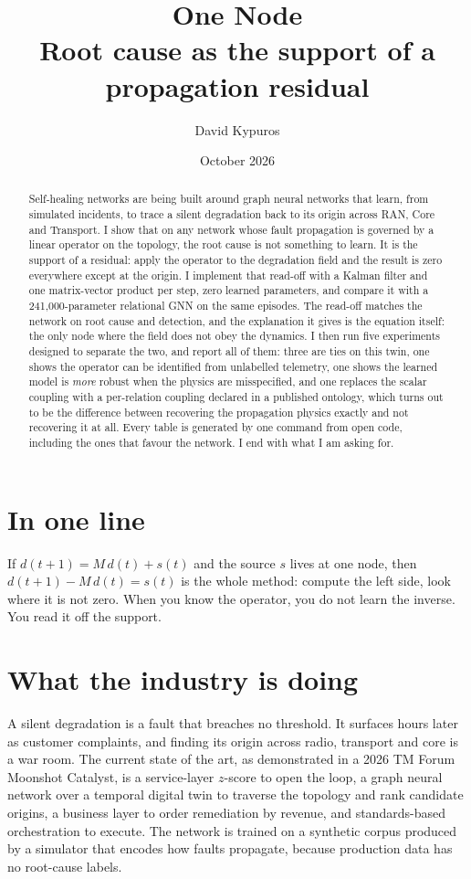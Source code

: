 \documentclass[11pt,a4paper]{article}
\title{\textbf{One Node}\\[0.3em]\large Root cause as the support of a propagation residual}
\author{David Kypuros}
\date{October 2026}
\begin{document}
\maketitle

\begin{abstract}
\noindent Self-healing networks are being built around graph neural networks that learn, from
simulated incidents, to trace a silent degradation back to its origin across RAN, Core and
Transport. I show that on any network whose fault propagation is governed by a linear operator on
the topology, the root cause is not something to learn. It is the support of a residual: apply the
operator to the degradation field and the result is zero everywhere except at the origin. I
implement that read-off with a Kalman filter and one matrix-vector product per step, zero learned
parameters, and compare it with a 241{,}000-parameter relational GNN on the same episodes. The
read-off matches the network on root cause and detection, and the explanation it gives is the
equation itself: the only node where the field does not obey the dynamics. I then run five
experiments designed to separate the two, and report all of them: three are ties on this twin, one
shows the operator can be identified from unlabelled telemetry, one shows the learned model is
\emph{more} robust when the physics are misspecified, and one replaces the scalar coupling with a
per-relation coupling declared in a published ontology, which turns out to be the difference
between recovering the propagation physics exactly and not recovering it at all. Every table is generated by one command from
open code, including the ones that favour the network. I end with what I am asking for.
\end{abstract}

\section*{In one line}
If $d(t{+}1)=M\,d(t)+s(t)$ and the source $s$ lives at one node, then $d(t{+}1)-M\,d(t)=s(t)$ is
the whole method: compute the left side, look where it is not zero. When you know the operator, you
do not learn the inverse. You read it off the support.

\section{What the industry is doing}
A silent degradation is a fault that breaches no threshold. It surfaces hours later as customer
complaints, and finding its origin across radio, transport and core is a war room. The current
state of the art, as demonstrated in a 2026 TM Forum Moonshot Catalyst, is a service-layer
$z$-score to open the loop, a graph neural network over a temporal digital twin to traverse the
topology and rank candidate origins, a business layer to order remediation by revenue, and
standards-based orchestration to execute. The network is trained on a synthetic corpus produced by
a simulator that encodes how faults propagate, because production data has no root-cause labels.
\end{document}
